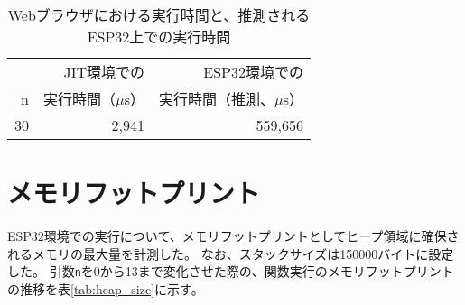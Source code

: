 \begin{table}[htbp]
  \caption{Webブラウザにおける実行時間と、推測されるESP32上での実行時間}
  \label{tab:fib_time_browser}
  \begin{center}
    \begin{tabular}{rrr}
      \hline
         & JIT環境での & ESP32環境での \\
       n & 実行時間（$\mu$s） & 実行時間（推測、$\mu$s） \\ \hline \hline
      30 & 2,941 & 559,656 \\ \hline
    \end{tabular}
  \end{center}
\end{table}

\section{メモリフットプリント}

ESP32環境での実行について、メモリフットプリントとしてヒープ領域に確保されるメモリの最大量を計測した。
なお、スタックサイズは150000バイトに設定した。
引数\verb|n|を0から13まで変化させた際の、関数実行のメモリフットプリントの推移を表\ref{tab:heap_size}に示す。

